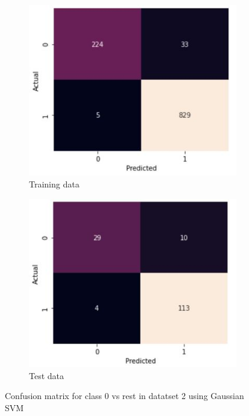 \documentclass[11pt]{article}
\begin{document}
\begin{figure}[h]
\centering
	\begin{subfigure}[b]{0.45\textwidth}
	\centering
	\includegraphics[scale=0.5]{dataset2_gauss_0_cm_train.jpg}
	\caption{Training data}
	\label{fig:fig3.2.1.1}
	\end{subfigure}
	\begin{subfigure}[b]{0.45\textwidth}
	\centering
	\includegraphics[scale=0.5]{dataset2_gauss_0_cm_test.jpg}
	\caption{Test data}
	\label{fig:fig3.2.1.2}
	\end{subfigure}
\caption{Confusion matrix for class 0 vs rest in datatset 2 using Gaussian SVM}
\label{fig:fig3.2.1}
\end{figure}
\end{document}
